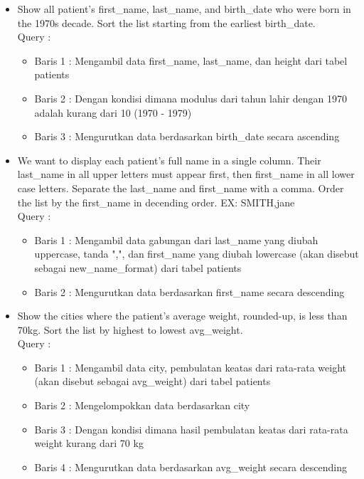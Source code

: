 \documentclass[]{article}
\begin{document}
\begin{itemize}
        \item Show all patient's first\_name, last\_name, and birth\_date who were born in the 1970s decade. Sort the list starting from the earliest birth\_date.
        \\Query :
        
        \begin{itemize}
            \item Baris 1 : Mengambil data first\_name, last\_name, dan height dari tabel patients
            \item Baris 2 : Dengan kondisi dimana modulus dari tahun lahir dengan 1970 adalah kurang dari 10 (1970 - 1979)
            \item Baris 3 : Mengurutkan data berdasarkan birth\_date secara ascending
        \end{itemize}

        \item We want to display each patient's full name in a single column. Their last\_name in all upper letters must appear first, then first\_name in all lower case letters. Separate the last\_name and first\_name with a comma. Order the list by the first\_name in decending order. EX: SMITH,jane
        \\Query :
        
        \begin{itemize}
            \item Baris 1 : Mengambil data gabungan dari last\_name yang diubah uppercase, tanda ",", dan first\_name yang diubah lowercase (akan disebut sebagai new\_name\_format) dari tabel patients
            \item Baris 2 : Mengurutkan data berdasarkan first\_name secara descending
        \end{itemize}

        \item Show the cities where the patient's average weight, rounded-up, is less than 70kg. Sort the list by highest to lowest avg\_weight.
        \\Query :
        
        \begin{itemize}
            \item Baris 1 : Mengambil data city, pembulatan keatas dari rata-rata weight (akan disebut sebagai avg\_weight) dari tabel patients
            \item Baris 2 : Mengelompokkan data berdasarkan city
            \item Baris 3 : Dengan kondisi dimana hasil pembulatan keatas dari rata-rata weight kurang dari 70 kg
            \item Baris 4 : Mengurutkan data berdasarkan avg\_weight secara descending
        \end{itemize}


\end{itemize}
\end{document}
